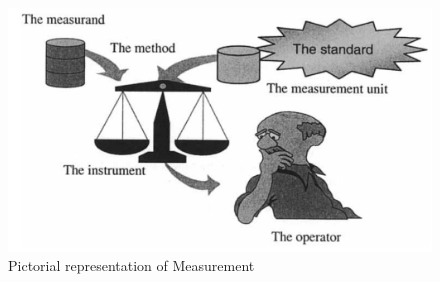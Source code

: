 \documentclass[12pt, right open]{memoir}
\begin{document}
\begin{figure}
\centering
\caption{Pictorial representation of Measurement}
\label{fig:pictorial_representation_of_measurement}
\includegraphics[scale=.5]{measurement.png}
\end{figure}
\end{document}
